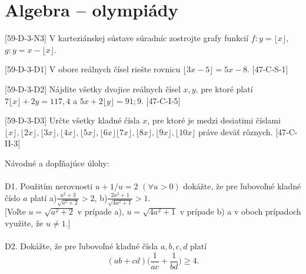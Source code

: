 \section{Algebra -- olympiády}
\begin{tcolorbox}[breakable,notitle,boxrule=0pt,colback=light-gray,colframe=light-gray]\ul [59-D-3-N3] V karteziánskej sústave súradníc zostrojte grafy funkcií $f: y = \lfloor x \rfloor$, $g: y = x - \lfloor x \rfloor$.\\
\end{tcolorbox}
\begin{tcolorbox}[breakable,notitle,boxrule=0pt,colback=light-gray,colframe=light-gray]\ul [59-D-3-D1] V obore reálnych čísel riešte rovnicu $\lfloor  3x-5 \rfloor = 5x - 8$. [47-C-S-1]\\
\end{tcolorbox}
\begin{tcolorbox}[breakable,notitle,boxrule=0pt,colback=light-gray,colframe=light-gray]\ul [59-D-3-D2] Nájdite všetky dvojice reálnych čísel $x, y$, pre ktoré platí $7 \lfloor x \rfloor + 2y = 117,4$ a $5x + 2 \lfloor y \rfloor = 91;9$. [47-C-I-5]\\
\end{tcolorbox}
\begin{tcolorbox}[breakable,notitle,boxrule=0pt,colback=light-gray,colframe=light-gray]\ul [59-D-3-D3] Určte všetky kladné čísla $x$, pre ktoré je medzi desiatimi číslami $\lfloor x \rfloor, \lfloor 2x \rfloor,\lfloor 3x\rfloor, \lfloor 4x \rfloor, \lfloor 5x \rfloor, \lfloor 6x\rfloor \lfloor 7x \rfloor, \lfloor 8x\rfloor, \lfloor 9x \rfloor, \lfloor 10x \rfloor$ práve deväť rôznych. [47-C-II-3]\\
\end{tcolorbox}
\begin{tcolorbox}[breakable,notitle,boxrule=0pt,colback=light-gray,colframe=light-gray]\ul
\end{tcolorbox}
Návodné a dopľňajúce úlohy:\\
\\
D1. Použitím nerovnosti $u + 1/u = 2$ $(\forall u > 0)$ dokážte, že pre ľubovoľné kladné číslo $a$
platí
a)$\frac{a^2+3}{\sqrt{a^2+2}}>2$, b)$ \frac{2a^2+1}{\sqrt{4a^2+1}}>1$.\\
{[Voľte $u =\sqrt{a^2+2}$ v prípade a), $u =\sqrt{4a^2+1}$ v prípade b) a v oboch prípadoch
využite, že $u \neq 1$.]}\\
\\
D2. Dokážte, že pre ľubovoľné kladné čísla $a, b, c, d $ platí
$$(ab + cd)  \big( \frac{1}{ac} + \frac{1}{bd}\big)\geq 4.$$
